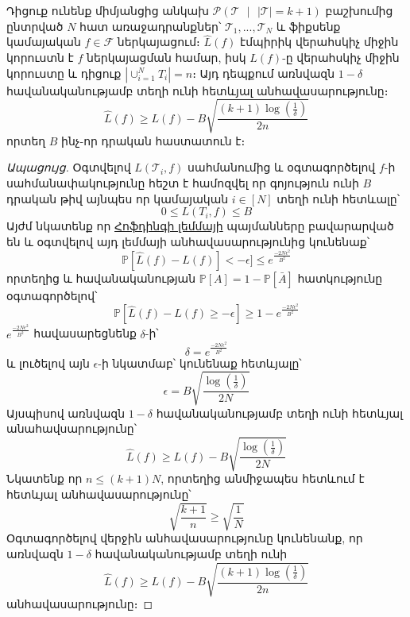 \documentclass[12pt]{article}
\begin{document}
\begin{lemma}
\label{task_conc_lemm}
Դիցուք ունենք միմյանցից անկախ $\mathcal{P}(\mathcal{T} \text{ } |\text{ }  |\mathcal{T}| = k +1)$ բաշխումից ընտրված $N$ հատ առաջադրանքներ՝ $\mathcal{T}_1, ..., \mathcal{T}_N$ և ֆիքսենք կամայական $f \in \mathcal{F}$ ներկայացում։ $\hat{L}(f)$ էմպիրիկ վերահսկիչ միջին կորուստն է $f$ ներկայացման համար,  իսկ $L(f)$-ը վերահսկիչ միջին կորուստը և դիցուք $|\cup_{i=1}^N{T_i}| = n$։
Այդ դեպքում առնվազն $1-\delta$ հավանականությամբ տեղի ունի հետևյալ անհավասարությունը։
\begin{equation}
\hat{L}(f) \geq L(f) - B\sqrt{\frac{\left(k+1\right)\log \left(\frac{1}{\delta}\right) }{2n}}
\end{equation}
որտեղ $B$ ինչ-որ դրական հաստատուն է։
\end{lemma}
\begin{proof}[Ապացույց]
Օգտվելով $L(\mathcal{T}_i, f)$ սահմանումից և օգտագործելով $f$-ի սահմանափակությունը հեշտ է համոզվել որ գոյություն ունի $B$ դրական թիվ այնպես որ կամայական $i \in [N]$ տեղի ունի հետևալը՝
$$0 \leq L(T_i,f) \leq B$$
Այժմ նկատենք որ \hyperref [hofding_inq]{Հոֆդինգի լեմմայի} պայմանները բավարարված են և օգտվելով այդ լեմմայի անհավասարությունից կունենաք՝
$$\mathbb{P}[\hat{L}(f) - L(f)]< -\epsilon] \leq e^{\frac{-2N\epsilon^2}{B^2}}$$
որտեղից և հավանականության $\mathbb{P}[A] = 1 - \mathbb{P}[\bar A]$ հատկությունը օգտագործելով՝
$$\mathbb{P}[\hat{L}(f) - L(f) \geq -\epsilon] \geq 1 -e^{\frac{-2N\epsilon^2}{B^2}} $$
$e^{\frac{-2N\epsilon^2}{B^2}}$ հավասարեցնենք $\delta$-ի՝
$$\delta = e^{\frac{-2N\epsilon^2}{B^2}}$$
և լուծելով այն $\epsilon$-ի նկատմաբ՝ կունենաք հետևյալը՝
$$\epsilon = B \sqrt{ \frac{\log\left(\frac{1}{\delta}\right)}{2N}} $$
Այսպիսով առնվազն $1-\delta$ հավանականությամբ տեղի ունի հետևյալ անահավսարությունը՝
$$\hat{L}(f) \geq L(f) - B \sqrt{ \frac{\log\left(\frac{1}{\delta}\right)}{2N}}$$
Նկատենք որ $n \leq (k+1)N$, որտեղից անմիջապես հետևում է հետևյալ անհավասարությունը՝
$$\sqrt{\frac{k+1}{n}} \geq \sqrt{\frac{1}{N}}$$
Օգտագործելով վերջին անհավասարությունը կունենանք, որ առնվազն $1-\delta$ հավանականությամբ տեղի ունի
$$\hat{L}(f) \geq L(f) - B\sqrt{\frac{\left(k+1\right)\log \left(\frac{1}{\delta}\right) }{2n}}$$
անհավասարությունը։
\end{proof}
\end{document}
